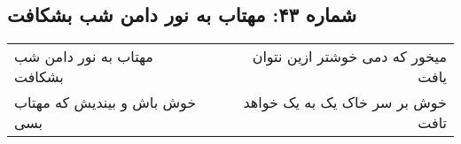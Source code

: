 \begin{center}
\section*{شماره ۴۳: مهتاب به نور دامن شب بشکافت}
\label{sec:043}
\begin{longtable}{l p{0.5cm} r}
مهتاب به نور دامن شب بشکافت
&&
میخور که دمی خوشتر ازین نتوان یافت
\\
خوش باش و بیندیش که مهتاب بسی
&&
خوش بر سر خاک یک به یک خواهد تافت
\\
\end{longtable}
\end{center}

